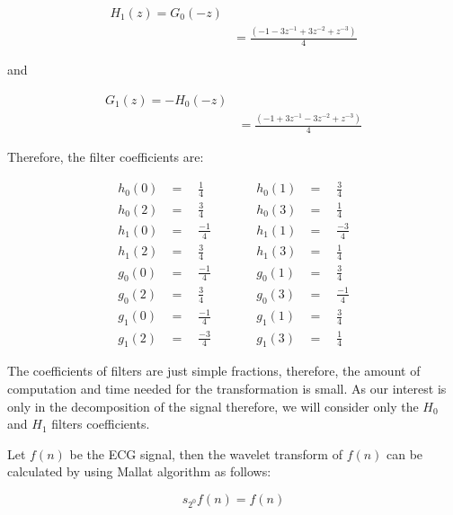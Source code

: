\begin{equation} \label{eq1}
\begin{split}
H_1(z) = G_0(-z) \\
& = \frac{(-1 - 3z^{-1} + 3z^{-2} + z^{-3})}{4}
\end{split}
\end{equation}

and

\begin{equation} \label{eq1}
\begin{split}
G_1(z) = -H_0(-z) \\
& = \frac{(-1 + 3z^{-1} - 3z^{-2} + z^{-3})}{4}
\end{split}
\end{equation}

Therefore, the filter coefficients are:

\begin{equation}
\label{eqn:filters}
\begin{aligned}
h_0(0) & =  \quad \frac{1}{4}    & \quad &\quad  h_0(1) &= \quad \frac{3}{4} \\
h_0(2) & =  \quad \frac{3}{4}    & \quad &\quad   h_0(3) &= \quad \frac{1}{4} \\[1ex]
h_1(0) & =  \quad \frac{- 1}{4}  & \quad &\quad   h_1(1) &= \quad \frac{-3}{4} \\
h_1(2) & =  \quad \frac{3}{4}    & \quad &\quad   h_1(3) &= \quad \frac{1}{4} \\[1ex]
g_0(0) & =  \quad \frac{-1}{4}   & \quad &\quad   g_0(1) &= \quad \frac{3}{4} \\
g_0(2) & =  \quad \frac{3}{4}    & \quad &\quad   g_0(3) &= \quad \frac{-1}{4} \\[1ex]
g_1(0) & =  \quad \frac{-1}{4}   & \quad &\quad   g_1(1) &= \quad \frac{3}{4} \\
g_1(2) & =  \quad \frac{-3}{4}   & \quad &\quad   g_1(3) &= \quad \frac{1}{4}
\end{aligned}
\end{equation}

The coefficients of filters are just simple fractions, therefore, the amount of computation and time needed for the transformation is small. As our interest is only in the decomposition of the signal therefore, we will consider only the $H_0$ and $H_1$ filters coefficients.

Let $f(n)$ be the ECG signal, then the wavelet transform of $f(n)$ can be calculated by using Mallat algorithm as follows:

\begin{equation} 
{ s_{2^0}f(n) = f(n)   }
\end{equation}

